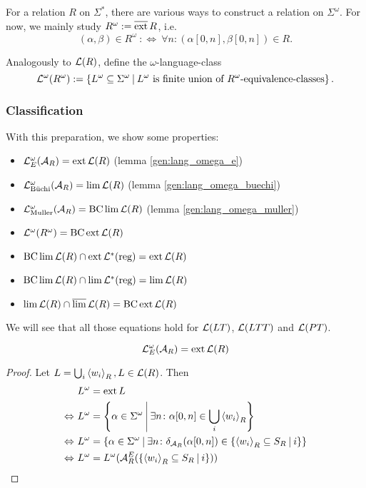 \begin{mydef}
For a relation $R$ on $\Sigma^*$, there are various ways to construct a relation on $\Sigma^\omega$. For now, we mainly study $R^\omega := \operatorname{\overline{ext}} R$, i.e.
\[ (\alpha,\beta) \in R^\omega \ :\Leftrightarrow \ \forall n \colon (\alpha[0,n],\beta[0,n]) \in R . \]

Analogously to $\mathcal{L}(R)$, define the $\omega$-language-class
\[ \Lang^\omega(R^\omega) := \Set{L^\omega \subseteq \Sigma^\omega}{\text{$L^\omega$ is finite union of $R^\omega$-equivalence-classes}} . \]
\end{mydef}

\subsubsection{Classification}

With this preparation, we show some properties:
\begin{itemize}
\item $\mathcal{L}^\omega_E(\mathcal{A}_R) = \operatorname{ext} \mathcal{L}(R)$ (lemma \ref{gen:lang_omega_e})
\item $\mathcal{L}^\omega_{\text{Büchi}}(\mathcal{A}_R) = \lim \mathcal{L}(R)$ (lemma \ref{gen:lang_omega_buechi})
\item $\mathcal{L}^\omega_{\text{Muller}}(\mathcal{A}_R) = \operatorname{BC} \lim \mathcal{L}(R)$ (lemma \ref{gen:lang_omega_muller})
\item $\mathcal{L}^\omega(R^\omega) = \operatorname{BC} \operatorname{ext} \mathcal{L}(R)$
\item $\operatorname{BC} \lim \mathcal{L}(R) \cap \operatorname{ext} \mathcal{L}^*(\text{reg}) = \operatorname{ext} \mathcal{L}(R)$
\item $\operatorname{BC} \lim \mathcal{L}(R) \cap \lim \mathcal{L}^*(\text{reg}) = \lim \mathcal{L}(R)$
\item $\lim \mathcal{L}(R) \cap \operatorname{\overline{lim}} \mathcal{L}(R) = \operatorname{BC} \operatorname{ext} \mathcal{L}(R)$
\end{itemize}

We will see that all those equations hold for $\mathcal{L}(LT)$, $\mathcal{L}(LTT)$ and $\mathcal{L}(PT)$.

\begin{lemma}
\label{gen:lang_omega_e}
\[ \mathcal{L}^\omega_E(\mathcal{A}_R) = \operatorname{ext} \mathcal{L}(R) \]
\begin{proof}
Let $L = \bigcup_i \left< w_i\right>_R, L \in \mathcal{L}(R)$. Then
\begin{align*}
& L^\omega = \ext L \\
\Leftrightarrow \ & L^\omega = \Set{\alpha \in \Sigma^\omega}{\exists n \colon \alpha[0,n] \in \bigcup_i \left< w_i\right>_R} \\
\Leftrightarrow \ & L^\omega = \Set{\alpha \in \Sigma^\omega}{\exists n \colon \delta_{\A_R}(\alpha[0,n]) \in \Set{\left< w_i\right>_R \subseteq S_R}{i}} \\
\Leftrightarrow \ & L^\omega = L^\omega(\A^E_R(\Set{\left< w_i\right>_R \subseteq S_R}{i}))
\end{align*}
\end{proof}
\end{lemma}

